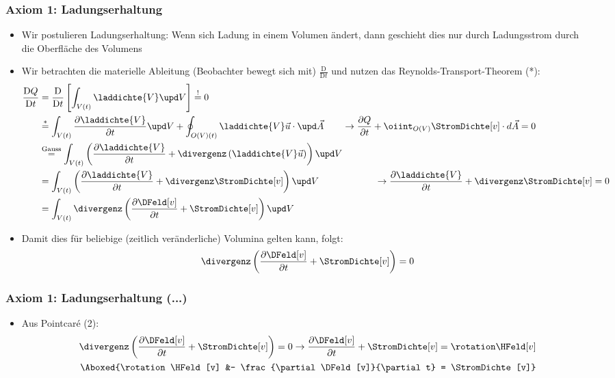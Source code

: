 \begin{frame}
  \frametitle{Axiom 1: Ladungserhaltung}
\begin{itemize}[<+->]
\item Wir postulieren Ladungserhaltung: Wenn sich Ladung in einem Volumen ändert, dann geschieht dies nur durch Ladungsstrom durch die Oberfläche des Volumens 
\item Wir betrachten die materielle Ableitung (Beobachter bewegt sich mit) $\frac{\mathrm{D}}{\mathrm{D} t}$ und nutzen das Reynolds-Transport-Theorem (*):
  \begin{align*}
\frac{\mathrm{D} Q}{\mathrm{D} t} & = \frac{\mathrm{D}}{\mathrm{D} t}\left[ \int_{V(t)} \laddichte{V} \upd V \right] \stackrel{!}{=} 0\\
 &\stackrel{*}{=} \int_{V(t)} \frac{\partial \laddichte{V}}{\partial t} \upd V + \oint_{O(V)(t)}\laddichte{V} \vec{u}\cdot \upd\vec{A} \qquad \to \frac{\partial Q}{\partial t} + \oiint_{O(V)} \StromDichte[v]\cdot d\vec{A} = 0\\
& \stackrel{\text{Gauss}}{=} \int_{V(t)} \left(\frac{\partial \laddichte{V}}{\partial t} + \divergenz \left(\laddichte{V} \vec{u} \right) \right) \upd V  \\
&= \int_{V(t)} \left(\frac{\partial \laddichte{V}}{\partial t} + \divergenz \StromDichte[v] \right) \upd V  \qquad\qquad\qquad \to \frac{\partial \laddichte{V}}{\partial t} + \divergenz \StromDichte[v] = 0 \\
&= \int_{V(t)} \divergenz \left( \frac{\partial \DFeld[v]}{\partial t} + \StromDichte[v]\right) \upd V
  \end{align*}
  \item Damit dies für beliebige (zeitlich veränderliche) Volumina gelten kann, folgt:
    \begin{equation*}
      \divergenz \left( \frac{\partial \DFeld[v]}{\partial t} + \StromDichte[v]\right) = 0
      \end{equation*}
    
    \end{itemize}

\end{frame}

\begin{frame}
  \frametitle{Axiom 1: Ladungserhaltung (...)}
\begin{itemize}[<+->]
\item Aus Pointcaré (2):
  \begin{align*}
    \divergenz \left( \frac{\partial \DFeld[v]}{\partial t} + \StromDichte[v]\right) = 0 \to \frac{\partial \DFeld[v]}{\partial t} + \StromDichte[v] = \rotation\HFeld[v] &\\
    \Aboxed{\rotation\HFeld[v] &- \frac{\partial \DFeld[v]}{\partial t} = \StromDichte[v]} 
    \end{align*}
\end{itemize}
\end{frame}

